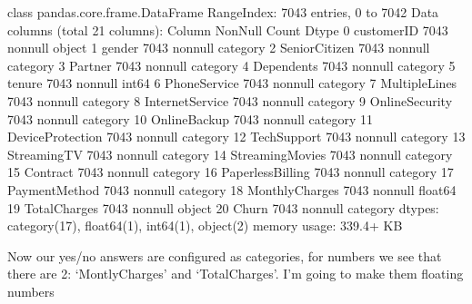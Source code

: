 \documentclass[letterpaper,10pt,english]{jupyterBook}
\begin{document}
\begin{sphinxVerbatim}[commandchars=\\\{\}]
   \PYG{p}{]}\PYG{p}{]}
\end{sphinxVerbatim}

\begin{sphinxVerbatim}[commandchars=\\\{\}]
\PYGZlt{}class \PYGZsq{}pandas.core.frame.DataFrame\PYGZsq{}\PYGZgt{}
RangeIndex: 7043 entries, 0 to 7042
Data columns (total 21 columns):
 \PYGZsh{}   Column            Non\PYGZhy{}Null Count  Dtype   
\PYGZhy{}\PYGZhy{}\PYGZhy{}  \PYGZhy{}\PYGZhy{}\PYGZhy{}\PYGZhy{}\PYGZhy{}\PYGZhy{}            \PYGZhy{}\PYGZhy{}\PYGZhy{}\PYGZhy{}\PYGZhy{}\PYGZhy{}\PYGZhy{}\PYGZhy{}\PYGZhy{}\PYGZhy{}\PYGZhy{}\PYGZhy{}\PYGZhy{}\PYGZhy{}  \PYGZhy{}\PYGZhy{}\PYGZhy{}\PYGZhy{}\PYGZhy{}   
 0   customerID        7043 non\PYGZhy{}null   object  
 1   gender            7043 non\PYGZhy{}null   category
 2   SeniorCitizen     7043 non\PYGZhy{}null   category
 3   Partner           7043 non\PYGZhy{}null   category
 4   Dependents        7043 non\PYGZhy{}null   category
 5   tenure            7043 non\PYGZhy{}null   int64   
 6   PhoneService      7043 non\PYGZhy{}null   category
 7   MultipleLines     7043 non\PYGZhy{}null   category
 8   InternetService   7043 non\PYGZhy{}null   category
 9   OnlineSecurity    7043 non\PYGZhy{}null   category
 10  OnlineBackup      7043 non\PYGZhy{}null   category
 11  DeviceProtection  7043 non\PYGZhy{}null   category
 12  TechSupport       7043 non\PYGZhy{}null   category
 13  StreamingTV       7043 non\PYGZhy{}null   category
 14  StreamingMovies   7043 non\PYGZhy{}null   category
 15  Contract          7043 non\PYGZhy{}null   category
 16  PaperlessBilling  7043 non\PYGZhy{}null   category
 17  PaymentMethod     7043 non\PYGZhy{}null   category
 18  MonthlyCharges    7043 non\PYGZhy{}null   float64 
 19  TotalCharges      7043 non\PYGZhy{}null   object  
 20  Churn             7043 non\PYGZhy{}null   category
dtypes: category(17), float64(1), int64(1), object(2)
memory usage: 339.4+ KB
\end{sphinxVerbatim}

\sphinxAtStartPar
Now our yes/no answers are configured as categories, for numbers we see that there are 2: ‘MontlyCharges’ and ‘TotalCharges’.
I’m going to make them floating numbers
\end{document}
